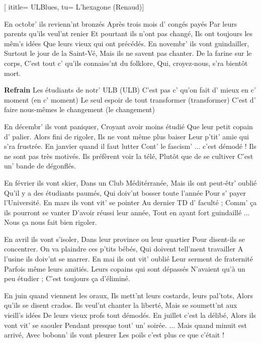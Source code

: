  [
ititle= {ULBlues},
tu= {L'hexagone (Renaud)}]


\beginverse
En octobr' ils revienn'nt bronzés
Après trois mois d' congés payés
Par leurs parents qu'ils veul'nt renier
Et pourtant ils n'ont pas changé,
Ils ont toujours les mêm's idées
Que leurs vieux qui ont précédés.
En novembr' ils vont guindailler,
Surtout le jour de la Saint-Vé,
Mais ils ne savent pas chanter.
De la farine sur le corps,
C'est tout c' qu'ils connaiss'nt du folklore,
Qui, croyez-nous, s'ra bientôt mort.
\endverse

\beginchorus
\textbf {Refrain}
Les étudiants de notr' ULB (ULB)
C'est pas c' qu'on fait d' mieux en c' moment (en c' moment)
Le seul espoir de tout transformer (transformer)
C'est d' faire nous-mêmes le changement (le changement)
\endchorus

\beginverse
En décembr' ils vont paniquer,
Croyant avoir moins étudié
Que leur petit copain d' palier.
Alors fini de rigoler,
Ils ne vont même plus baiser
Leur p'tit' amie qui s'ra frustrée.
En janvier quand il faut lutter
Cont' le fascism' ... c'est démodé !
Ils ne sont pas très motivés.
Ils préfèrent voir la télé,
Plutôt que de se cultiver
C'est un' bande de dégonflés.
\endverse

\beginverse
En février ils vont skier,
Dans un Club Méditérranée,
Mais ils ont peut-êtr' oublié
Qu'il y a des étudiants paumés,
Qui doiv'nt bosser toute l'année
Pour s' payer l'Université.
En mars ils vont vit' se pointer
Au dernier TD d' faculté ;
Comm' ça ils pourront se vanter
D'avoir réussi leur année,
Tout en ayant fort guindaillé ...
Nous ça nous fait bien rigoler.
\endverse

\beginverse
En avril ils vont s'isoler,
Dans leur province ou leur quartier
Pour disent-ils se concentrer.
On va plaindre ces p'tits bébés,
Qui doivent tell'ment travailler
A l'usine ils doiv'nt se marrer.
En mai ils ont vit' oublié
Leur serment de fraternité
Parfois même leurs amitiés.
Leurs copains qui sont dépassés
N'avaient qu'à un peu étudier ;
C'est toujours ça d'éliminé.
\endverse

\beginverse
En juin quand viennent les oraux,
Ils mett'nt leurs costards, leurs pal'tots,
Alors qu'ils se disent crados.
Ils veul'nt chanter la liberté,
Mais se soumett'nt aux vieill's idées
De leurs vieux profs tout démodés.
En juillet c'est la délibé,
Alors ils vont vit' se saouler
Pendant presque tout' un' soirée.
... Mais quand minuit est arrivé,
Avec bobonn' ils vont pleurer
Les poils c'est plus ce que c'était !
\endverse

\endsong